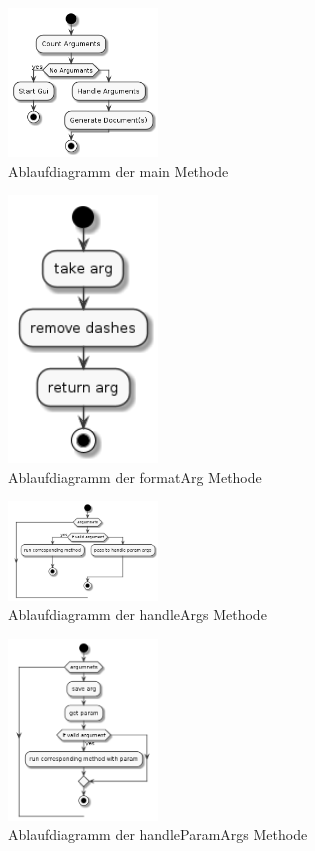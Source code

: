 \documentclass[stu, a4paper, 11pt, floatsintext]{apa7}
\begin{document}
\begin{figure}[!htbp]
\centering
\includegraphics[width=150px]{../technical_documentation/diagramm/uml/flowcharts/cli/Main.png}
\caption{\label{main-methode}Ablaufdiagramm der main Methode}
\end{figure}

\begin{figure}[!htbp]
\centering
\includegraphics[width=150px]{../technical_documentation/diagramm/uml/flowcharts/cli/formatArg.png}
\caption{\label{formatArg-methode}Ablaufdiagramm der formatArg Methode}
\end{figure}

\begin{figure}[!htbp]
\centering
\includegraphics[width=150px]{../technical_documentation/diagramm/uml/flowcharts/cli/handleArgs.png}
\caption{\label{handleArgs-methode}Ablaufdiagramm der handleArgs Methode}
\end{figure}

\begin{figure}[!htbp]
\centering
\includegraphics[width=150px]{../technical_documentation/diagramm/uml/flowcharts/cli/handleParamArgs.png}
\caption{\label{handleParamArgs-methode}Ablaufdiagramm der handleParamArgs Methode}
\end{figure}
\end{document}
